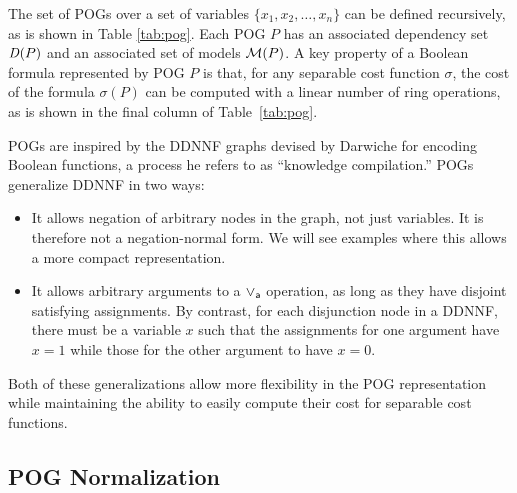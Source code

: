 \documentclass{llncs}
\newcommand{\por}{\mathbin{\lor_{\sf a}}}
\newcommand{\pite}{\mbox{\it ITE}_{\sf v}}
\newcommand{\interpset}[1]{{\cal M}(#1)}
\newcommand{\cost}{\sigma}
\newcommand{\depend}{{\it D}}
\begin{document}
The set of POGs over a set of variables
$\{x_1, x_2, \ldots, x_n\}$
can be defined recursively, as is shown in Table
\ref{tab:pog}.  Each POG $P$ has an associated dependency set
$\depend(P)$ and an associated set of models $\interpset{P}$.
A key property of a Boolean formula represented by POG
$P$ is that, for any separable cost function $\cost$, the cost of the
formula $\cost(P)$ can be computed with a linear number of ring
operations, as is shown in the final column of Table~\ref{tab:pog}.

POGs are inspired by the DDNNF graphs devised by
Darwiche for encoding Boolean functions, a process he refers to as
``knowledge compilation.''
POGs generalize DDNNF in two ways:
\begin{itemize}
\item It allows negation of arbitrary nodes in the graph, not just
  variables.  It is therefore not a negation-normal form.  We will see
  examples where this allows a more compact representation.
\item It allows arbitrary arguments to a $\por$ operation, as long as
  they have disjoint satisfying assignments.  By contrast, for each
  disjunction node in a DDNNF, there must be a variable $x$ such that
  the assignments for one argument have $x=1$ while those for
  the other argument to have $x=0$.
\end{itemize}
  Both of these generalizations allow more flexibility in the POG
  representation while maintaining the ability to easily compute their
  cost for separable cost functions.



\subsection{POG Normalization}
\end{document}
